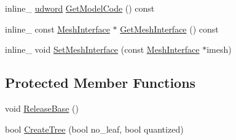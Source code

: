 \begin{DoxyCompactItemize}
\item 
inline\+\_\+ \hyperlink{IceTypes_8h_a44c6f1920ba5551225fb534f9d1a1733}{udword} \hyperlink{classOpcode_1_1BaseModel_a98a124482ec138a5dc3c362914bbc527}{Get\+Model\+Code} () const 
\item 
inline\+\_\+ const \hyperlink{classOpcode_1_1MeshInterface}{Mesh\+Interface} $\ast$ \hyperlink{classOpcode_1_1BaseModel_a6d0c9275877300bc9e4be4c4ff6d37b6}{Get\+Mesh\+Interface} () const 
\item 
inline\+\_\+ void \hyperlink{classOpcode_1_1BaseModel_a8b61e87a490cb0cb12859b11e2c90321}{Set\+Mesh\+Interface} (const \hyperlink{classOpcode_1_1MeshInterface}{Mesh\+Interface} $\ast$imesh)
\end{DoxyCompactItemize}
\subsection*{Protected Member Functions}
\begin{DoxyCompactItemize}
\item 
void \hyperlink{classOpcode_1_1BaseModel_ac0b331eda307bebf1c2b0ed568cd0b65}{Release\+Base} ()
\item 
bool \hyperlink{classOpcode_1_1BaseModel_acd802b59a4199af81a6b629c386bd950}{Create\+Tree} (bool no\+\_\+leaf, bool quantized)
\end{DoxyCompactItemize}
